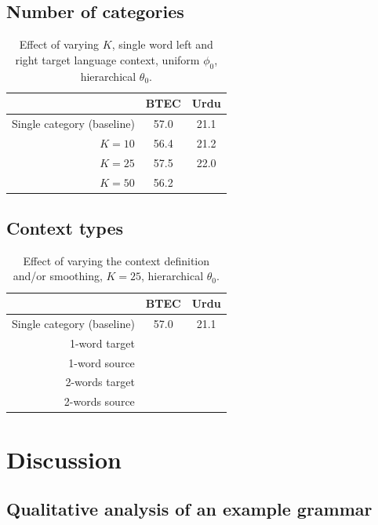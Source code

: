\subsection{Number of categories}

\begin{table}[h]
\caption{Effect of varying $K$, single word left and right target language context, uniform $\phi_0$, hierarchical $\theta_0$.}
\begin{center}
\begin{tabular}{r|c|c}
& BTEC & Urdu \\
\hline
Single category (baseline) & 57.0 & 21.1 \\
\hline
$K=10$ & 56.4 & 21.2 \\
$K=25$ & 57.5 & 22.0 \\
$K=50$ & 56.2 & \\
\end{tabular}
\end{center}
\label{tab:npbaselines}
\end{table}%


\subsection{Context types}

\begin{table}[h]
\caption{Effect of varying the context definition and/or smoothing, $K=25$, hierarchical $\theta_0$.}
\begin{center}
\begin{tabular}{r|c|c}
& BTEC & Urdu \\
\hline
Single category (baseline) & 57.0 & 21.1 \\
\hline
1-word target &  & \\
1-word source &  & \\
2-words target & & \\
2-words source & & \\
\end{tabular}
\end{center}
\label{tab:npbaselines}
\end{table}%



\section{Discussion}

\subsection{Qualitative analysis of an example grammar}

